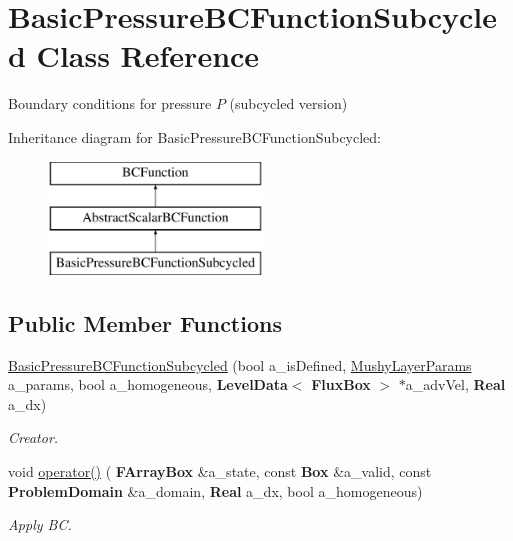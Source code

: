 \hypertarget{class_basic_pressure_b_c_function_subcycled}{}\section{Basic\+Pressure\+B\+C\+Function\+Subcycled Class Reference}
\label{class_basic_pressure_b_c_function_subcycled}


Boundary conditions for pressure $ P $ (subcycled version)  


Inheritance diagram for Basic\+Pressure\+B\+C\+Function\+Subcycled\+:\begin{figure}[H]
\begin{center}
\leavevmode
\includegraphics[height=3.000000cm]{class_basic_pressure_b_c_function_subcycled}
\end{center}
\end{figure}
\subsection*{Public Member Functions}
\begin{DoxyCompactItemize}
\item 
\mbox{\label{class_basic_pressure_b_c_function_subcycled_a6a5170b9ac2de09c1a41a48dd7bb53cd}} 
\hyperlink{class_basic_pressure_b_c_function_subcycled_a6a5170b9ac2de09c1a41a48dd7bb53cd}{Basic\+Pressure\+B\+C\+Function\+Subcycled} (bool a\+\_\+is\+Defined, \hyperlink{class_mushy_layer_params}{Mushy\+Layer\+Params} a\+\_\+params, bool a\+\_\+homogeneous, \textbf{ Level\+Data}$<$ \textbf{ Flux\+Box} $>$ $\ast$a\+\_\+adv\+Vel, \textbf{ Real} a\+\_\+dx)
\begin{DoxyCompactList}\small\item\em Creator. \end{DoxyCompactList}\item 
\mbox{\label{class_basic_pressure_b_c_function_subcycled_a11485aa5383fdd9b183da7905d852276}} 
void \hyperlink{class_basic_pressure_b_c_function_subcycled_a11485aa5383fdd9b183da7905d852276}{operator()} (\textbf{ F\+Array\+Box} \&a\+\_\+state, const \textbf{ Box} \&a\+\_\+valid, const \textbf{ Problem\+Domain} \&a\+\_\+domain, \textbf{ Real} a\+\_\+dx, bool a\+\_\+homogeneous)
\begin{DoxyCompactList}\small\item\em Apply BC. \end{DoxyCompactList}\end{DoxyCompactItemize}

